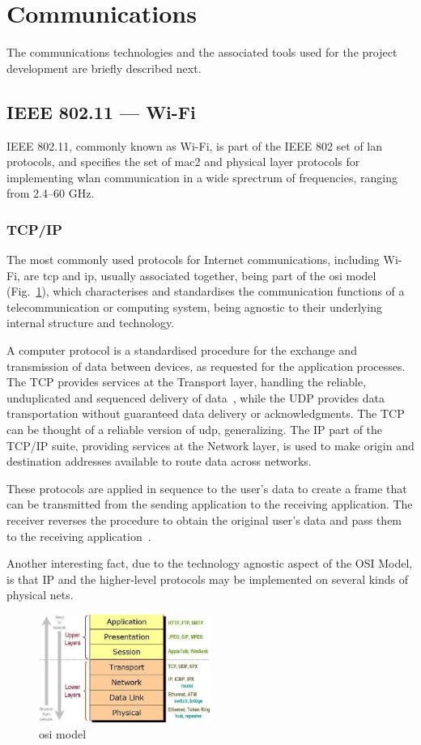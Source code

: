 %
\section{Communications}
\label{sec:comm}
The communications technologies and the associated tools used for the project development are briefly described next.

\subsection{IEEE 802.11 --- Wi-Fi}%
\label{sec:wifi}
IEEE 802.11, commonly known as Wi-Fi, is part of the IEEE 802 set of \gls{lan} protocols, and specifies the set of \gls{mac2} and
physical layer protocols for implementing \gls{wlan}
communication in a wide sprectrum of frequencies, ranging from 2.4--60 GHz.

\subsubsection{TCP/IP}%
\label{sec:tcpip}
The most commonly used protocols for Internet communications, including Wi-Fi,
are \gls{tcp} and \gls{ip}, usually associated together, being part of the \gls{osi} model
(Fig.~\ref{fig:osi-model}), which characterises and standardises the
communication functions of a telecommunication or computing system, being
agnostic to their underlying internal structure and technology.

A computer protocol is a standardised procedure for the exchange and
transmission of data between devices, as requested for the application processes.
The TCP provides services at the Transport layer, handling the reliable, unduplicated
and sequenced delivery of data~\cite{carne2004professional}, while the UDP provides data transportation
without guaranteed data delivery or acknowledgments. The TCP can be thought of
a reliable version of \gls{udp}, generalizing. The IP part of the TCP/IP suite, providing
services at the Network layer, is used to make origin and destination addresses
available to route data across networks.

These protocols are applied in sequence to the user's data to create a frame
that can be transmitted from the sending application to the receiving
application.
The receiver reverses the procedure to obtain the original user’s data and pass
them to the receiving application~\cite{carne2004professional}.

Another interesting fact, due to the technology agnostic aspect of the OSI
Model, is that IP and the higher-level protocols may be implemented on several
kinds of physical nets.
\begin{figure}[!hbt]
\centering
    \includegraphics[width=0.5\textwidth]{./img/osi-model.png}
  \caption{\gls{osi} model}%
\label{fig:osi-model}
\end{figure}
%
